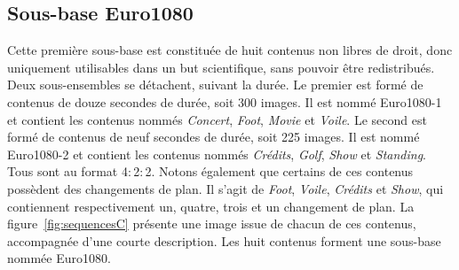 \subsection{Sous-base Euro1080} \label{ssec:seq-euro1080}
Cette première sous-base est constituée de huit contenus non libres de droit, donc uniquement utilisables dans un but scientifique, sans pouvoir être redistribués. Deux sous-ensembles se détachent, suivant la durée. Le premier est formé de contenus de douze secondes de durée, soit 300 images. Il est nommé Euro1080-1 et contient les contenus nommés \emph{Concert}, \emph{Foot}, \emph{Movie} et \emph{Voile}. Le second est formé de contenus de neuf secondes de durée, soit 225 images. Il est nommé Euro1080-2 et contient les contenus nommés \emph{Crédits}, \emph{Golf}, \emph{Show} et \emph{Standing}. Tous sont au format 4$:$2$:$2. Notons également que certains de ces contenus possèdent des changements de plan. Il s'agit de \emph{Foot}, \emph{Voile}, \emph{Crédits} et \emph{Show}, qui contiennent respectivement un, quatre, trois et un changement de plan. La figure~\ref{fig:sequencesC} présente une image issue de chacun de ces contenus, accompagnée d'une courte description. Les huit contenus forment une sous-base nommée Euro1080.

